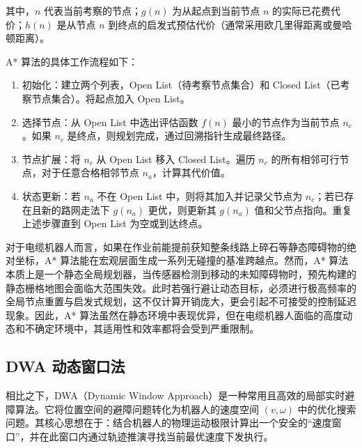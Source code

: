 其中，$n$ 代表当前考察的节点；$g(n)$ 为从起点到当前节点 $n$ 的实际已花费代价；$h(n)$ 是从节点 $n$ 到终点的启发式预估代价（通常采用欧几里得距离或曼哈顿距离）。

A* 算法的具体工作流程如下：
\begin{enumerate}
    \item 初始化：建立两个列表，Open List（待考察节点集合）和 Closed List（已考察节点集合）。将起点加入 Open List。
    \item 选择节点：从 Open List 中选出评估函数 $f(n)$ 最小的节点作为当前节点 $n_c$。如果 $n_c$ 是终点，则规划完成，通过回溯指针生成最终路径。
    \item 节点扩展：将 $n_c$ 从 Open List 移入 Closed List。遍历 $n_c$ 的所有相邻可行节点，对于任意合格相邻节点 $n_a$，计算其代价值。
    \item 状态更新：若 $n_a$ 不在 Open List 中，则将其加入并记录父节点为 $n_c$；若已存在且新的路网走法下 $g(n_a)$ 更优，则更新其 $g(n_a)$ 值和父节点指向。重复上述步骤直到 Open List 为空或到达终点。
\end{enumerate}

对于电缆机器人而言，如果在作业前能提前获知整条线路上碎石等静态障碍物的绝对坐标，A* 算法能在宏观层面生成一系列无碰撞的基准跨越点。然而，A* 算法本质上是一个静态全局规划器，当传感器检测到移动的未知障碍物时，预先构建的静态栅格地图会面临大范围失效。此时若强行避让动态目标，必须进行极高频率的全局节点重置与启发式规划，这不仅计算开销庞大，更会引起不可接受的控制延迟现象。因此，A* 算法虽然在静态环境中表现优异，但在电缆机器人面临的高度动态和不确定环境中，其适用性和效率都将会受到严重限制。

\subsection{DWA 动态窗口法}
相比之下，DWA（Dynamic Window Approach）是一种常用且高效的局部实时避障算法。它将位置空间的避障问题转化为机器人的速度空间 $(v, \omega)$ 中的优化搜索问题。其核心思想在于：结合机器人的物理运动极限计算出一个安全的“速度窗口”，并在此窗口内通过轨迹推演寻找当前最优速度下发执行。\cite{bai2021uav}


